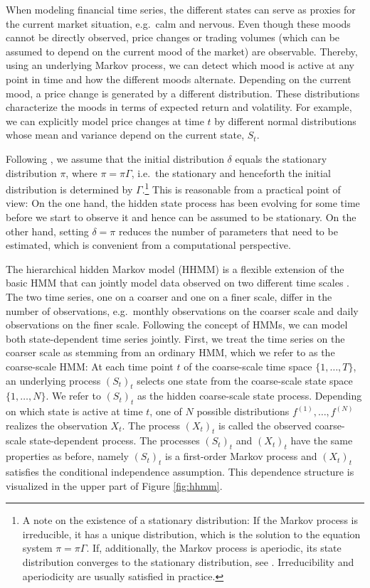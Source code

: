 \documentclass[article]{jss}
\begin{document}
When modeling financial time series, the different states can serve as proxies for the current market situation, e.g.\ calm and nervous. Even though these moods cannot be directly observed, price changes or trading volumes (which can be assumed to depend on the current mood of the market) are observable. Thereby, using an underlying Markov process, we can detect which mood is active at any point in time and how the different moods alternate. Depending on the current mood, a price change is generated by a different distribution. These distributions characterize the moods in terms of expected return and volatility. For example, we can explicitly model price changes at time $t$ by different normal distributions whose mean and variance depend on the current state, $S_t$.

Following \cite{zuc16}, we assume that the initial distribution $\delta$ equals the stationary distribution $\pi$, where $\pi = \pi \Gamma$, i.e.\ the stationary and henceforth the initial distribution is determined by $\Gamma$.\footnote{A note on the existence of a stationary distribution: If the Markov process is irreducible, it has a unique distribution, which is the solution to the equation system $\pi = \pi \Gamma$. If, additionally, the Markov process is aperiodic, its state distribution converges to the stationary distribution, see \cite{nor97}. Irreducibility and aperiodicity are usually satisfied in practice.} This is reasonable from a practical point of view: On the one hand, the hidden state process has been evolving for some time before we start to observe it and hence can be assumed to be stationary. On the other hand, setting $\delta=\pi$ reduces the number of parameters that need to be estimated, which is convenient from a computational perspective.

The hierarchical hidden Markov model (HHMM) is a flexible extension of the basic HMM that can jointly model data observed on two different time scales \citep{oel21}. The two time series, one on a coarser and one on a finer scale, differ in the number of observations, e.g.\ monthly observations on the coarser scale and daily observations on the finer scale. Following the concept of HMMs, we can model both state-dependent time series jointly. First, we treat the time series on the coarser scale as stemming from an ordinary HMM, which we refer to as the coarse-scale HMM: At each time point $t$ of the coarse-scale time space $\{1,\dots,T\}$, an underlying process $(S_t)_t$ selects one state from the coarse-scale state space $\{1,\dots,N\}$. We refer to $(S_t)_t$ as the hidden coarse-scale state process. Depending on which state is active at time $t$, one of $N$ possible distributions $f^{(1)},\dots,f^{(N)}$ realizes the observation $X_t$. The process $(X_t)_t$ is called the observed coarse-scale state-dependent process. The processes $(S_t)_t$ and $(X_t)_t$ have the same properties as before, namely $(S_t)_t$ is a first-order Markov process and $(X_t)_t$ satisfies the conditional independence assumption. This dependence structure is visualized in the upper part of Figure \ref{fig:hhmm}.
\end{document}
